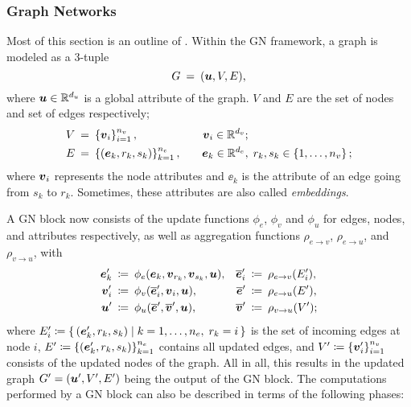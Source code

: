 \subsubsection{Graph Networks}
\label{subsubsec:gns}

Most of this section is an outline of \cite[Section 3.2]{https://doi.org/10.48550/arxiv.1806.01261}. 
Within the GN framework, a graph is modeled as a 3-tuple
\[ G \: = \: (\boldsymbol{u}, V, E) \text{,} \]
where $\boldsymbol{u} \in \mathbb{R}^{d_u}$ is a global attribute of the graph. $V$ and $E$ are the set of nodes and
set of edges respectively;
\begin{align*}
    V \: &= \: \left\{\boldsymbol{v}_i\right\}_{i=1}^{n_v},             &\quad \boldsymbol{v}_i \in \mathbb{R}^{d_v}&; \\
    E \: &= \: \left\{(\boldsymbol{e}_k, r_k, s_k)\right\}_{k=1}^{n_e}, &\quad \boldsymbol{e}_k \in \mathbb{R}^{d_e}&, \; r_k, s_k \in \left\{1, \dots, n_v\right\};
\end{align*}
where $\boldsymbol{v}_i$ represents the node attributes and $\ee_k$ is the attribute of an edge
going from $s_k$ to $r_k$. Sometimes, these attributes are also called \textit{embeddings}.

A GN block now consists of the update functions $\phi_e$, $\phi_v$ and $\phi_u$ for edges,
nodes, and attributes respectively, as well as aggregation functions $\rho_{e \to v}$,
$\rho_{e \to u}$, and $\rho_{v \to u}$, with
\begin{align*}
    \boldsymbol{e}_k' \: &\coloneqq \: \phi_e(\boldsymbol{e}_k, \boldsymbol{v}_{r_k}, \boldsymbol{v}_{s_k}, \boldsymbol{u}), 
    &\overline{\boldsymbol{e}}'_i \: &\coloneqq \: \rho_{e \to v}(E_i'), \\
    \boldsymbol{v}_i' \: &\coloneqq \: \phi_v(\overline{\boldsymbol{e}}'_i, \boldsymbol{v}_i, \boldsymbol{u}), 
    &\overline{\boldsymbol{e}}' \: &\coloneqq \: \rho_{e \to u}(E'), \\
    \boldsymbol{u}' \: &\coloneqq \: \phi_u(\overline{\boldsymbol{e}}', \overline{\boldsymbol{v}}', \boldsymbol{u}),
    &\overline{\boldsymbol{v}}' \: &\coloneqq \: \rho_{v \to u}(V');
\end{align*}
where $E_i' \coloneqq \left\{\, (\boldsymbol{e}_k', r_k, s_k) \; \middle| \; k = 1, \dots, n_e, \; r_k = i \,\right\}$
is the set of incoming edges at node $i$, $E' \coloneqq \left\{(\boldsymbol{e}_k', r_k, s_k)\right\}_{k=1}^{n_e}$
contains all updated edges, and $V' \coloneqq \left\{\boldsymbol{v}_i'\right\}_{i=1}^{n_v}$ consists
of the updated nodes of the graph. All in all, this results in the updated graph 
$G' = (\boldsymbol{u}', V', E')$ being the output of the GN block.
The computations performed by a GN block can also be described in terms of the following phases:

